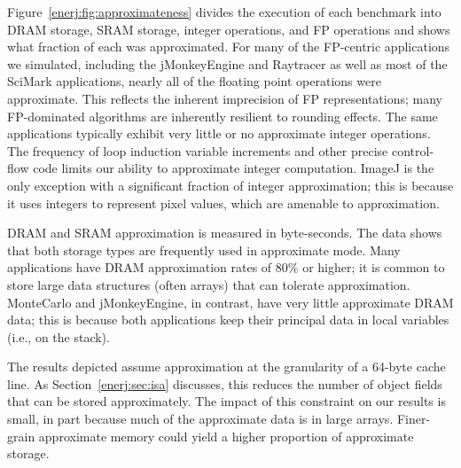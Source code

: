 Figure~\ref{enerj:fig:approximateness} divides the execution of each
benchmark into DRAM storage, SRAM storage, integer operations, and FP
operations and shows what fraction of each was approximated. For
many of the FP-centric applications we simulated, including the
jMonkeyEngine and Raytracer as well as most of the SciMark
applications, nearly all of the floating point operations were
approximate. This reflects the inherent imprecision of FP
representations; many FP-dominated algorithms are inherently resilient
to rounding effects.
The same applications typically exhibit very little or no
approximate integer operations. The frequency of loop induction
variable increments and other precise control-flow code limits our
ability to approximate integer computation. ImageJ is the only
exception with a significant fraction of integer approximation; this is
because it uses integers to represent pixel values, which are amenable
to approximation.

DRAM and SRAM approximation is measured in byte-seconds.
The data shows that
both storage types are frequently used in approximate
mode. Many applications have DRAM approximation rates
of 80\% or higher; it is common to store large data
structures (often arrays) that can tolerate approximation. MonteCarlo and
jMonkeyEngine, in contrast, have very little approximate DRAM data;
this is because both applications keep their principal data in local
variables (i.e., on the stack).

The results depicted assume approximation at the granularity of a
64-byte cache line. As Section~\ref{enerj:sec:isa} discusses, this
reduces the number of object fields that can be stored
approximately. The impact of this constraint on our
results is small, in part because much of the approximate data is
in large arrays. Finer-grain approximate memory could yield a
higher proportion of approximate storage.




